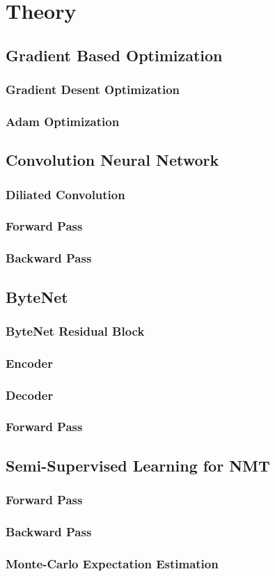 \chapter{Theory}


\clearpage

\section{Gradient Based Optimization}
\subsection{Gradient Desent Optimization}
\subsection{Adam Optimization}
\clearpage

\section{Convolution Neural Network}
\subsection{Diliated Convolution}
\subsection{Forward Pass}
\subsection{Backward Pass}
\clearpage


\clearpage

\section{ByteNet}
\subsection{ByteNet Residual Block}
\subsection{Encoder}
\subsection{Decoder}
\subsection{Forward Pass}
\clearpage

\section{Semi-Supervised Learning for NMT}
\subsection{Forward Pass}
\subsection{Backward Pass}
\subsection{Monte-Carlo Expectation Estimation}
\clearpage